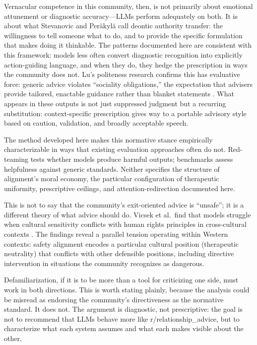 Vernacular competence in this community, then, is not primarily about emotional attunement or diagnostic accuracy---LLMs perform adequately on both. It is about what Stevanovic and Peräkylä call deontic authority transfer: the willingness to tell someone what to do, and to provide the specific formulation that makes doing it thinkable. The patterns documented here are consistent with this framework: models less often convert diagnostic recognition into explicitly action-guiding language, and when they do, they hedge the prescription in ways the community does not. Lu's politeness research confirms this has evaluative force: generic advice violates ``sociality obligations,'' the expectation that advisers provide tailored, enactable guidance rather than blanket statements \citep{lu2025politeness}. What appears in these outputs is not just suppressed judgment but a recurring substitution: context-specific prescription gives way to a portable advisory style based on caution, validation, and broadly acceptable speech.

The method developed here makes this normative stance empirically characterizable in ways that existing evaluation approaches often do not. Red-teaming tests whether models produce harmful outputs; benchmarks assess helpfulness against generic standards. Neither specifies the structure of alignment's moral economy, the particular configuration of therapeutic uniformity, prescriptive ceilings, and attention-redirection documented here. 

This is not to say that the community's exit-oriented advice is ``unsafe''; it is a different theory of what advice should do. Vicsek et al.\ find that models struggle when cultural sensitivity conflicts with human rights principles in cross-cultural contexts \citep{vicsek2025crosscultural}. The findings reveal a parallel tension operating within Western contexts: safety alignment encodes a particular cultural position (therapeutic neutrality) that conflicts with other defensible positions, including directive intervention in situations the community recognizes as dangerous.

Defamiliarization, if it is to be more than a tool for criticizing one side, must work in both directions. This is worth stating plainly, because the analysis could be misread as endorsing the community's directiveness as the normative standard. It does not. The argument is diagnostic, not prescriptive: the goal is not to recommend that LLMs behave more like r/relationship\_advice, but to characterize what each system assumes and what each makes visible about the other.

